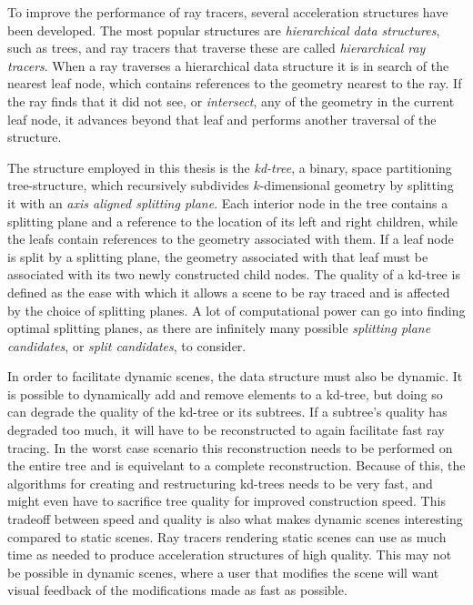 
To improve the performance of ray tracers, several acceleration structures have
been developed. The most popular structures are \textit{hierarchical data
  structures}, such as trees, and ray tracers that traverse these are called
\textit{hierarchical ray tracers}. When a ray traverses a hierarchical data
structure it is in search of the nearest leaf node, which contains references to
the geometry nearest to the ray. If the ray finds that it did not see, or
\textit{intersect}, any of the geometry in the current leaf node, it advances
beyond that leaf and performs another traversal of the structure.

The structure employed in this thesis is the \textit{kd-tree}, a binary, space
partitioning tree-structure, which recursively subdivides $k$-dimensional
geometry by splitting it with an \textit{axis aligned splitting plane}. Each
interior node in the tree contains a splitting plane and a reference to the
location of its left and right children, while the leafs contain references to
the geometry associated with them.
If a leaf node is split by a splitting plane, the geometry associated with that
leaf must be associated with its two newly constructed child nodes. The quality
of a kd-tree is defined as the ease with which it allows a scene to be ray
traced and is affected by the choice of splitting planes. A lot of computational
power can go into finding optimal splitting planes, as there are infinitely many
possible \textit{splitting plane candidates}, or \textit{split candidates}, to
consider.


In order to facilitate dynamic scenes, the data structure must also be
dynamic. It is possible to dynamically add and remove elements to a kd-tree, but
doing so can degrade the quality of the kd-tree or its subtrees. If a subtree's
quality has degraded too much, it will have to be reconstructed to again
facilitate fast ray tracing. In the worst case scenario this reconstruction
needs to be performed on the entire tree and is equivelant to a complete
reconstruction. Because of this, the algorithms for creating and restructuring
kd-trees needs to be very fast, and might even have to sacrifice tree quality
for improved construction speed. This tradeoff between speed and quality is also
what makes dynamic scenes interesting compared to static scenes. Ray tracers
rendering static scenes can use as much time as needed to produce acceleration
structures of high quality. This may not be possible in dynamic scenes, where a
user that modifies the scene will want visual feedback of the modifications made
as fast as possible.

